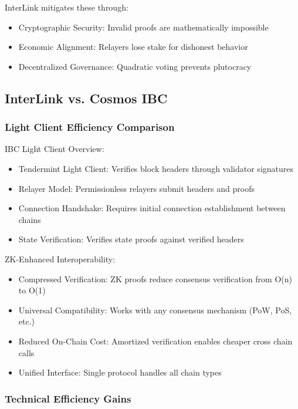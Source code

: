 \documentclass[11pt,a4paper]{article}
\begin{document}
InterLink mitigates these through:
\begin{itemize}
    \item Cryptographic Security: Invalid proofs are mathematically impossible
    \item Economic Alignment: Relayers lose stake for dishonest behavior
    \item Decentralized Governance: Quadratic voting prevents plutocracy
\end{itemize}

\subsection{InterLink vs. Cosmos IBC}

\subsubsection{Light Client Efficiency Comparison}

IBC Light Client Overview:
\begin{itemize}
    \item Tendermint Light Client: Verifies block headers through validator signatures
    \item Relayer Model: Permissionless relayers submit headers and proofs
    \item Connection Handshake: Requires initial connection establishment between chains
    \item State Verification: Verifies state proofs against verified headers
\end{itemize}

ZK-Enhanced Interoperability:
\begin{itemize}
    \item Compressed Verification: ZK proofs reduce consensus verification from O(n) to O(1)
    \item Universal Compatibility: Works with any consensus mechanism (PoW, PoS, etc.)
    \item Reduced On-Chain Cost: Amortized verification enables cheaper cross chain calls
    \item Unified Interface: Single protocol handles all chain types
\end{itemize}

\subsubsection{Technical Efficiency Gains}
\end{document}
